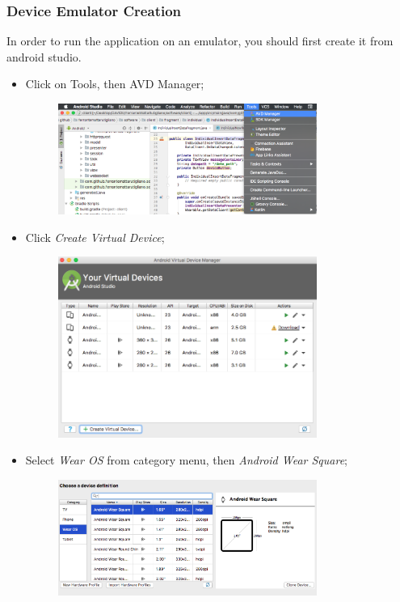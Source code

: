 \documentclass[a4paper]{article}
\begin{document}
\subsubsection{Device Emulator Creation}
In order to run the application on an emulator, you should first create it from android studio.
\begin{itemize}
    \item Click on Tools, then AVD Manager;
    \begin{figure}[!htpb]
    \centering
    \includegraphics[width=0.8\textwidth, keepaspectratio]{ITD/images/virtualdevice1.png}
    \end{figure}
    \newpage
    \item Click \textit{Create Virtual Device};
    \begin{figure}[!htpb]
    \centering
    \includegraphics[width=0.8\textwidth, keepaspectratio]{ITD/images/virtualdevice2.png}
    \end{figure}
    \item Select \textit{Wear OS} from category menu, then \textit{Android Wear Square};
    \begin{figure}[!htpb]
    \centering
    \includegraphics[width=0.8\textwidth, keepaspectratio]{ITD/images/virtualdevice3.png}

\end{figure}
\end{itemize}
\end{document}
